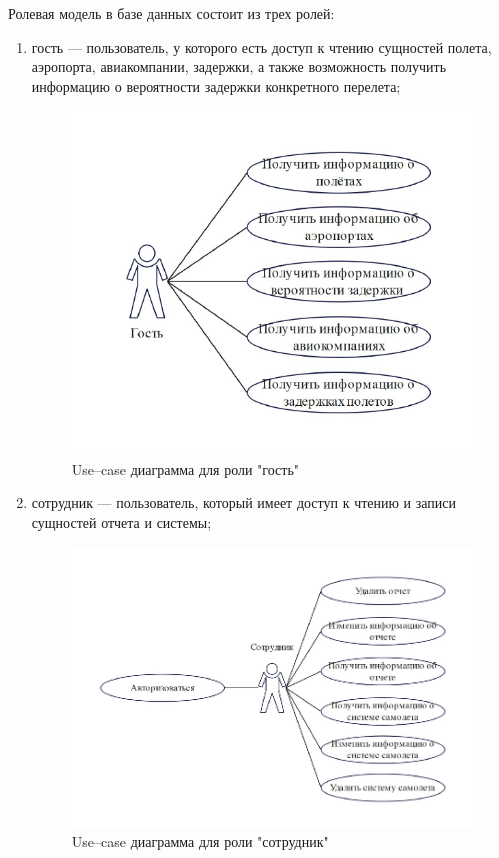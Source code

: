 Ролевая модель в базе данных состоит из трех ролей:
\begin{enumerate}[label=\arabic*)]
    \item гость --- пользователь, у которого есть доступ к чтению сущностей полета, аэропорта, авиакомпании, задержки, а также возможность получить информацию о вероятности задержки конкретного перелета;
    \begin{figure}[H]
        \centering
        \includegraphics[scale=0.7]{inc/Guest_role}
        \caption{Use--case диаграмма для роли "гость"}
        \label{fig:guest_role}
    \end{figure}

    \item сотрудник --- пользователь, который имеет доступ к чтению и записи сущностей отчета и системы;
    \begin{figure}[H]
        \centering
        \includegraphics[scale=0.7]{inc/Employee_role}
        \caption{Use--case диаграмма для роли "сотрудник"}
        \label{fig:client_role}
    \end{figure}


\end{enumerate}
